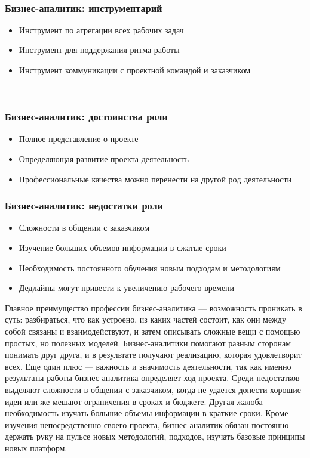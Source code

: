 \documentclass{../industrial-development}
\begin{document}
 ~\cite{Business}

\begin{frame} \frametitle{Бизнес-аналитик: инструментарий}
  \begin{itemize}
  \item Инструмент по агрегации всех рабочих задач
  \item Инструмент для поддержания ритма работы
  \item Инструмент коммуникации с проектной командой и заказчиком
  \end{itemize}
\end{frame}

  ~\cite{Business}

\begin{frame} \frametitle{Бизнес-аналитик: достоинства роли}
  \begin{itemize}
  \item Полное представление о проекте
  \item Определяющая развитие проекта деятельность
  \item Профессиональные качества можно перенести на другой род деятельности
  \end{itemize}
\end{frame}

\begin{frame} \frametitle{Бизнес-аналитик: недостатки роли}
  \begin{itemize}
  \item Сложности в общении с заказчиком
  \item Изучение больших объемов информации в сжатые сроки
  \item Необходимость постоянного обучения новым подходам и методологиям
  \item Дедлайны могут привести к увеличению рабочего времени 
  \end{itemize}
\end{frame}

\lecturenotes

Главное преимущество профессии бизнес-аналитика — возможность проникать в суть: разбираться, что как устроено, из каких частей состоит, как они между собой связаны и взаимодействуют, и затем описывать сложные вещи с помощью простых, но полезных моделей. Бизнес-аналитики помогают разным сторонам понимать друг друга, и в результате получают реализацию, которая удовлетворит всех. Еще один плюс — важность и значимость деятельности, так как именно результаты работы бизнес-аналитика определяет ход проекта. Среди недостатков выделяют сложности в общении с заказчиком, когда не удается донести хорошие идеи или же мешают ограничения в сроках и бюджете. Другая жалоба — необходимость изучать большие объемы информации в краткие сроки. Кроме изучения непосредственно своего проекта, бизнес-аналитик обязан постоянно держать руку на пульсе новых методологий, подходов, изучать базовые принципы новых платформ.
\end{document}
